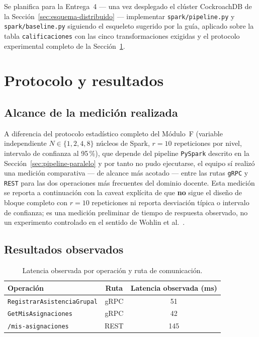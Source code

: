 \documentclass[12pt,a4paper]{article}
\begin{document}
Se planifica para la Entrega~4 --- una vez desplegado el clúster
CockroachDB de la Sección~\ref{sec:esquema-distribuido} --- implementar
\texttt{spark/pipeline.py} y \texttt{spark/baseline.py} siguiendo el
esqueleto sugerido por la guía, aplicado sobre la tabla
\texttt{calificaciones} con las cinco transformaciones exigidas y el
protocolo experimental completo de la Sección~\ref{sec:protocolo-resultados}.


\section{Protocolo y resultados}
\label{sec:protocolo-resultados}

\subsection{Alcance de la medición realizada}

A diferencia del protocolo estadístico completo del Módulo~F (variable
independiente $N\in\{1,2,4,8\}$ núcleos de Spark, $r=10$ repeticiones por
nivel, intervalo de confianza al 95\,\%), que depende del pipeline
\texttt{PySpark} descrito en la Sección~\ref{sec:pipeline-paralelo} y por
tanto no pudo ejecutarse, el equipo sí realizó una medición comparativa
--- de alcance más acotado --- entre las rutas \texttt{gRPC} y
\texttt{REST} para las dos operaciones más frecuentes del dominio docente.
Esta medición se reporta a continuación con la caveat explícita de que
\textbf{no} sigue el diseño de bloque completo con $r=10$ repeticiones ni
reporta desviación típica o intervalo de confianza; es una medición
preliminar de tiempo de respuesta observado, no un experimento controlado
en el sentido de Wohlin et al.~\cite{wohlin2012experimentation}.

\subsection{Resultados observados}

\begin{table}[h]
  \centering
  \caption{Latencia observada por operación y ruta de comunicación.}
  \label{tab:latencia}
  \begin{tabular}{@{}lcc@{}}
    \toprule
    Operación & Ruta & Latencia observada (ms) \\
    \midrule
    \texttt{RegistrarAsistenciaGrupal} & gRPC & 51 \\
    \texttt{GetMisAsignaciones}        & gRPC & 42 \\
    \texttt{/mis-asignaciones}         & REST & 145 \\
    \bottomrule
  \end{tabular}
\end{table}
\end{document}
